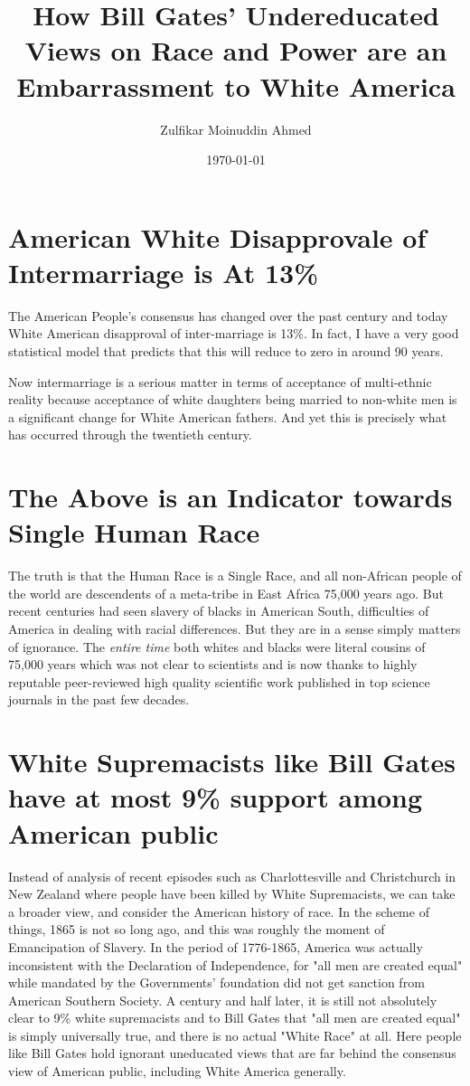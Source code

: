 \documentclass{amsart}
\title{How Bill Gates' Undereducated Views on Race and Power are an Embarrassment to White America}
\author{Zulfikar Moinuddin Ahmed}
\date{\today}
\begin{document}
\maketitle

\section{American White Disapprovale of Intermarriage is At 13\%}

The American People's consensus has changed over the past century and today White American disapproval of inter-marriage is 13\%.  In fact, I have a very good statistical model that predicts that this will reduce to zero in around 90 years.  

Now intermarriage is a serious matter in terms of acceptance of multi-ethnic reality because acceptance of white daughters being married to non-white men is a significant change for White American fathers.  And yet this is precisely what has occurred through the twentieth century.
 

\section{The Above is an Indicator towards Single Human Race}

The truth is that the Human Race is a Single Race, and all non-African people of the world are descendents of a meta-tribe in East Africa 75,000 years ago.  But recent centuries had seen slavery of blacks in American South, difficulties of America in dealing with racial differences.  But they are in a sense simply matters of ignorance.  The {\em entire time} both whites and blacks were literal cousins of 75,000 years which was not clear to scientists and is now thanks to highly reputable peer-reviewed high quality scientific work published in top science journals in the past few decades.  

\section{White Supremacists like Bill Gates have at most 9\% support among American public}

Instead of analysis of recent episodes such as Charlottesville and Christchurch in New Zealand where people have been killed by White Supremacists, we can take a broader view, and consider the American history of race.  In the scheme of things, 1865 is not so long ago, and this was roughly the moment of Emancipation of Slavery.  In the period of 1776-1865, America was actually inconsistent with the Declaration of Independence, for "all men are created equal" while mandated by the Governments' foundation did not get sanction from American Southern Society. A century and half later, it is still not absolutely clear to 9\% white supremacists and to Bill Gates that "all men are created equal" is simply universally true, and there is no actual "White Race" at all.  Here people like Bill Gates hold ignorant uneducated views that are far behind the consensus view of American public, including White America generally.  
\end{document}
